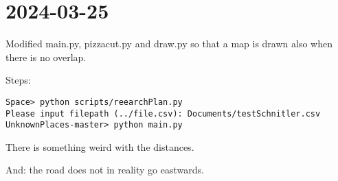 \documentclass[12pt]{book}
\begin{document}
\section{2024-03-25}

Modified main.py, pizzacut.py and draw.py so that a map is drawn also when there is no overlap. 

Steps:

\begin{lstlisting}
Space> python scripts/reearchPlan.py
Please input filepath (../file.csv): Documents/testSchnitler.csv
UnknownPlaces-master> python main.py
\end{lstlisting}

There is something weird with the distances.

And: the road does not in reality go eastwards.



\end{document}
